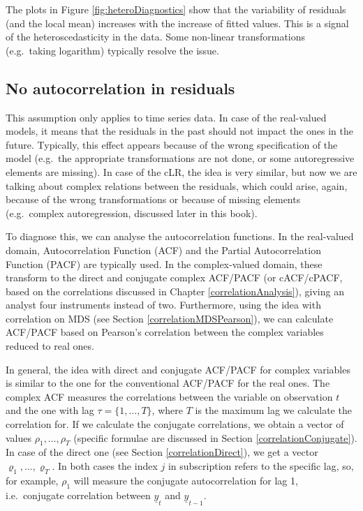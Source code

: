 \documentclass[
]{book}
\begin{document}
The plots in Figure \ref{fig:heteroDiagnostics} show that the variability of residuals (and the local mean) increases with the increase of fitted values. This is a signal of the heteroscedasticity in the data. Some non-linear transformations (e.g.~taking logarithm) typically resolve the issue.

\hypertarget{assumptionsResidualsAuto}{%
\subsection{No autocorrelation in residuals}\label{assumptionsResidualsAuto}}

This assumption only applies to time series data. In case of the real-valued models, it means that the residuals in the past should not impact the ones in the future. Typically, this effect appears because of the wrong specification of the model (e.g.~the appropriate transformations are not done, or some autoregressive elements are missing). In case of the cLR, the idea is very similar, but now we are talking about complex relations between the residuals, which could arise, again, because of the wrong transformations or because of missing elements (e.g.~complex autoregression, discussed later in this book).

To diagnose this, we can analyse the autocorrelation functions. In the real-valued domain, Autocorrelation Function (ACF) and the Partial Autocorrelation Function (PACF) are typically used. In the complex-valued domain, these transform to the direct and conjugate complex ACF/PACF (or cACF/cPACF, based on the correlations discussed in Chapter \ref{correlationAnalysis}), giving an analyst four instruments instead of two. Furthermore, using the idea with correlation on MDS (see Section \ref{correlationMDSPearson}), we can calculate ACF/PACF based on Pearson's correlation between the complex variables reduced to real ones.

In general, the idea with direct and conjugate ACF/PACF for complex variables is similar to the one for the conventional ACF/PACF for the real ones. The complex ACF measures the correlations between the variable on observation \(t\) and the one with lag \(\tau=\{1, \dots, T\}\), where \(T\) is the maximum lag we calculate the correlation for. If we calculate the conjugate correlations, we obtain a vector of values \(\rho_{1}, \dots, \rho_{T}\) (specific formulae are discussed in Section \ref{correlationConjugate}). In case of the direct one (see Section \ref{correlationDirect}), we get a vector \(\varrho_{1}, \dots, \varrho_{T}\). In both cases the index \(j\) in subscription refers to the specific lag, so, for example, \(\rho_{1}\) will measure the conjugate autocorrelation for lag 1, i.e.~conjugate correlation between \(\underline{y}_{t}\) and \(\underline{y}_{t-1}\).
\end{document}
